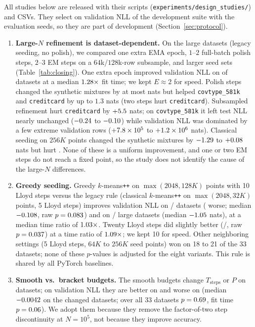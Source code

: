 \documentclass[10pt]{article} %
\begin{document}
All studies below are released with their scripts (\texttt{experiments/design\_studies/}) and CSVs. They select on validation NLL of the development suite with the evaluation seeds, so they are part of development (Section~\ref{sec:protocol}).
\begin{enumerate}[leftmargin=*,nosep]
  \item \textbf{Large-$N$ refinement is dataset-dependent.} On the \rnLarge{} large datasets (legacy seeding, no polish), we compared one extra EMA epoch, $1$--$2$ full-batch polish steps, $2$--$3$ EM steps on a $64$k/$128$k-row subsample, and larger seed sets (Table~\ref{tab:closing}). One extra epoch improved validation NLL on \rEpThreeBetter{} of \rnCloseDs{} datasets at a median $1.28\times$ fit time; we kept $E \approx 2$ for speed. Polish steps changed the synthetic mixtures by at most \rCloseBest{} nats but helped \texttt{covtype\_581k} and \texttt{creditcard} by up to $1.3$ nats (two steps hurt \texttt{creditcard}). Subsampled refinement hurt \texttt{creditcard} by $+5.5$ nats; on \texttt{covtype\_581k} it left test NLL nearly unchanged ($-0.24$ to $-0.10$) while validation NLL was dominated by a few extreme validation rows ($+7.8\times 10^{5}$ to $+1.2\times 10^{6}$ nats). Classical seeding on $256K$ points changed the synthetic mixtures by $-1.29$ to $+0.08$ nats but hurt \rSeedBigWorse{}. None of these is a uniform improvement, and one or two EM steps do not reach a fixed point, so the study does not identify the cause of the large-$N$ differences.
  \item \textbf{Greedy seeding.} Greedy $k$-means\texttt{++} on $\max(2048, 128K)$ points with 10 Lloyd steps versus the legacy rule (classical $k$-means\texttt{++} on $\max(2048, 32K)$ points, 5 Lloyd steps) improves validation NLL on \rSeedW{}/\rnDatasets{} datasets (\rSeedL{} worse; median $-0.108$, raw $p = 0.083$) and on \rSeedLW{}/\rnLarge{} large datasets (median $-1.05$ nats), at a median time ratio of $1.03\times$. Twenty Lloyd steps did slightly better (\rSeedTwentyW/\rSeedTwentyL, raw $p = 0.037$) at a time ratio of $1.09\times$; we kept 10 for speed. Other neighboring settings (5 Lloyd steps, $64K$ to $256K$ seed points) won on 18 to 21 of the 33 datasets; none of these $p$-values is adjusted for the eight variants. This rule is shared by all PyTorch baselines.
  \item \textbf{Smooth vs.\ bracket budgets.} The smooth budgets change $T_{\mathrm{steps}}$ or $P$ on \rLawChanged{} datasets; on validation NLL they are better on \rLawW{} and worse on \rLawL{} (median $-0.0042$ on the changed datasets; over all 33 datasets $p = 0.69$, fit time $p = 0.06$). We adopt them because they remove the factor-of-two step discontinuity at $N = 10^5$, not because they improve accuracy.

\end{enumerate}
\end{document}
